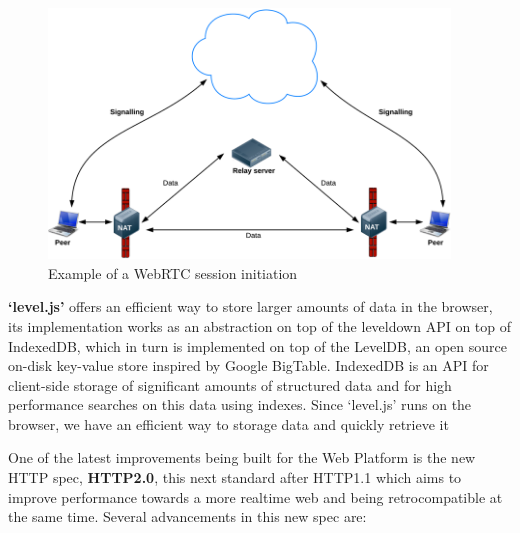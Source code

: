 \begin{figure}[h!]
  \centering
  \includegraphics[width=0.95\textwidth]{img/webrtc.png}
  \caption{Example of a WebRTC session initiation}
  \label{fig:webrtc}
\end{figure}

% 
% 


\textbf{`level.js'} offers an efficient way to store larger amounts of data in the browser, its implementation works as an abstraction on top of the leveldown API on top of IndexedDB\cite{Recommendation2013}, which in turn is implemented on top of the LevelDB\cite{JeffreyDean;SanjayGhemawat}, an open source on-disk key-value store inspired by Google BigTable. IndexedDB is an API for client-side storage of significant amounts of structured data and for high performance searches on this data using indexes. Since `level.js' runs on the browser, we have an efficient way to storage data and quickly retrieve it

One of the latest improvements being built for the Web Platform is the new HTTP spec, \textbf{HTTP2.0}\cite{Thomson2013}, this next standard after HTTP1.1 which aims to improve performance towards a more realtime web and being retrocompatible at the same time. Several advancements in this new spec are:

